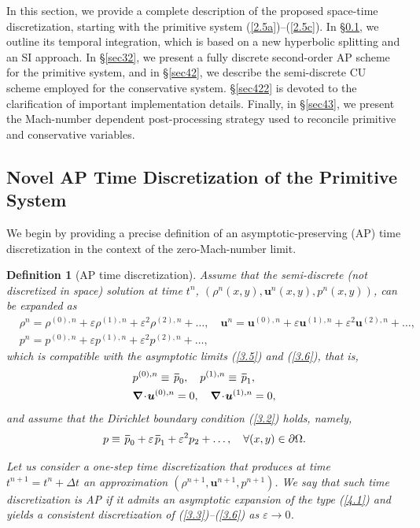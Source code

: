 \documentclass[A4paper,12pt,twoside]{article}
\newtheorem{definition}{Definition}[section]
\numberwithin{equation}{section}
\numberwithin{figure}{section}
\numberwithin{table}{section}
\def\bnabla{\bm{\nabla}}
\newcommand{\dt}{\Delta t}
\newcommand{\ve}{\varepsilon}
\newcommand\eref[1]{(\ref{#1})}
\newcommand*\xbar[1]{%
  \hbox{%
    \vbox{%
      \hrule height 0.5pt %
      \kern0.4ex%
      \hbox{%
        \kern-0.05em%
        \ensuremath{#1}%
        \kern-0.00em%
      }%
    }%
  }%
}
\begin{document}
In this section, we provide a complete description of the proposed space-time discretization, starting with the primitive system
\eref{2.5a}–\eref{2.5c}. In \S\ref{sec411}, we outline its temporal integration, which is based on a new hyperbolic splitting and an SI
approach. In \S\ref{sec32}, we present a fully discrete second-order AP scheme for the primitive system, and in \S\ref{sec42}, we describe
the semi-discrete CU scheme employed for the conservative system. \S\ref{sec422} is devoted to the clarification of important
implementation details. Finally, in \S\ref{sec43}, we present the Mach-number dependent post-processing strategy used to reconcile primitive
and conservative variables.

\subsection{Novel AP Time Discretization of the Primitive System}\label{sec411}
We begin by providing a precise definition of an asymptotic-preserving (AP) time discretization in the context of the zero-Mach-number
limit.
\begin{definition}[AP time discretization]\label{def41}
Assume that the {\color{blue}semi-discrete (not discretized in space) solution at time $t^n$, $(\rho^n(x,y),\bm u^n(x,y),p^n(x,y))$,} can be
expanded as
\begin{equation}
\begin{aligned}
&\rho^n=\rho^{(0),n}+\ve\rho^{(1),n}+\ve^2\rho^{(2),n}+\dots,\quad\bm u^n=\bm u^{(0),n}+\ve\bm u^{(1),n}+\ve^2\bm u^{(2),n}+\dots,\\
&p^n=p^{(0),n}+\ve p^{(1),n}+\ve^2p^{(2),n}+\dots,
\end{aligned}
\label{4.1}
\end{equation}
which is compatible with the asymptotic limits \eref{3.5} and \eref{3.6}, that is,
\begin{align}
&p^{(0),n}\equiv\,\xbar p_0,\quad p^{(1),n}\equiv\,\xbar p_1,\label{3.2f}\\
&\bnabla\!\cdot\!\bm u^{(0),n}=0,\quad\bnabla\!\cdot\!\bm u^{(1),n}=0,\label{4.2}
\end{align}
and assume that the Dirichlet boundary condition \eref{3.2} holds, namely,
\begin{equation}
p\equiv\,\xbar p_0+\ve\,\xbar p_1+\ve^2p_2+\dots,\quad\forall(x,y)\in\partial\Omega.
\label{3.4f}
\end{equation}

Let us consider a one-step time discretization that produces at time $t^{n+1}=t^n+\dt$ an approximation $(\rho^{n+1},\bm u^{n+1},p^{n+1})$.
We say that such time discretization is AP if it admits an asymptotic expansion of the type \eref{4.1} and yields a consistent
discretization of \eref{3.3}--\eref{3.6} as $\ve\to0$.
\end{definition}
\end{document}
